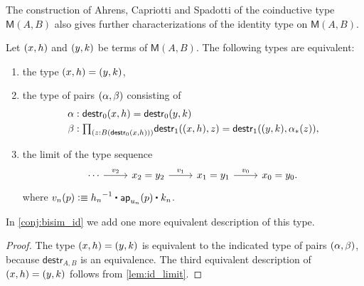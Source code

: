 The construction of Ahrens, Capriotti and Spadotti of the coinductive type
$\mathsf{M}(A,B)$ also gives further characterizations of the identity type
on $\mathsf{M}(A,B)$. 

\begin{lem}\label{lem:mtype_id}
Let ${\mathopen{}(x,h)\mathclose{}}$ and ${\mathopen{}(y,k)\mathclose{}}$ be terms of $\mathsf{M}(A,B)$. 
The following types are equivalent:
\begin{enumerate}
\item the type ${\mathopen{}(x,h)\mathclose{}}={\mathopen{}(y,k)\mathclose{}}$,
\item the type of pairs ${\mathopen{}(\alpha,\beta)\mathclose{}}$ consisting of
\begin{align*}
\alpha & : \mathsf{destr}_0(x,h)=\mathsf{destr}_0(y,k)\\
\beta & : \prd{z:B(\mathsf{destr}_0(x,h))}\mathsf{destr}_1(\pairr{x,h},z)=\mathsf{destr}_1(\pairr{y,k},\trans{\alpha}{z}),
\end{align*}
\item the limit of the type sequence
\begin{equation*}
\begin{tikzcd}
\cdots \arrow[r,"v_2"] & x_2=y_2 \arrow[r,"v_1"] & x_1=y_1 \arrow[r,"v_0"] & x_0=y_0.
\end{tikzcd}
\end{equation*}
where $v_n(p)\defeq \ct{\opp{h_n}}{\mapfunc{u_n}(p)}{k_n}$. 
\end{enumerate}
\end{lem}

\begin{rmk}
In \autoref{conj:bisim_id} we add one more equivalent description of this type.
\end{rmk}

\begin{proof}
The type ${\mathopen{}(x,h)\mathclose{}}={\mathopen{}(y,k)\mathclose{}}$ is equivalent to the indicated type of pairs
${\mathopen{}(\alpha,\beta)\mathclose{}}$, because $\mathsf{destr}_{A,B}$ is an equivalence. 
The third equivalent description of ${\mathopen{}(x,h)\mathclose{}}={\mathopen{}(y,k)\mathclose{}}$ follows from
\autoref{lem:id_limit}.
\end{proof}

